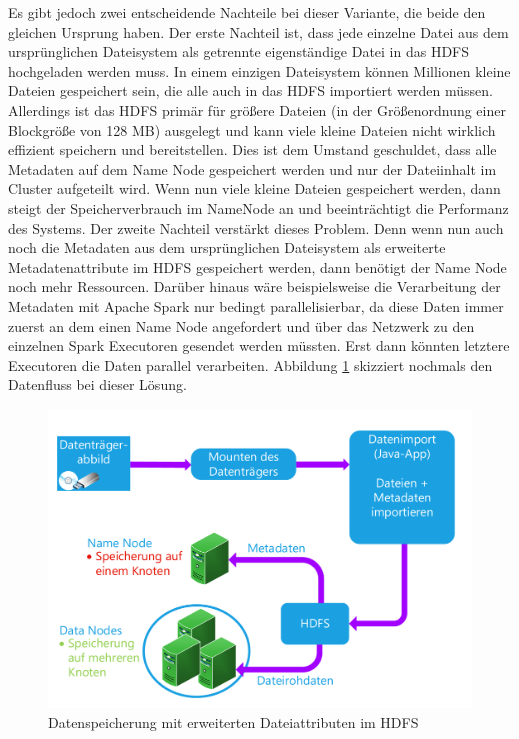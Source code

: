 \noindent
Es gibt jedoch zwei entscheidende Nachteile bei dieser Variante, die beide den gleichen Ursprung haben. 
Der erste Nachteil ist, dass jede einzelne Datei aus dem ursprünglichen Dateisystem als getrennte eigenständige Datei in das HDFS hochgeladen werden muss. In einem einzigen Dateisystem können Millionen kleine Dateien gespeichert sein, die alle auch in das HDFS importiert werden müssen. Allerdings ist das HDFS primär für größere Dateien (in der Größenordnung einer Blockgröße von 128 MB) ausgelegt und kann viele kleine Dateien nicht wirklich effizient speichern und bereitstellen. Dies ist dem Umstand geschuldet, dass alle Metadaten auf dem Name Node gespeichert werden und nur der Dateiinhalt im Cluster aufgeteilt wird.\cite[S. 16]{professional_hadoop} Wenn nun viele kleine Dateien gespeichert werden, dann steigt der Speicherverbrauch im NameNode an und beeinträchtigt die Performanz des Systems. Der zweite Nachteil verstärkt dieses Problem. Denn wenn nun auch noch die Metadaten aus dem ursprünglichen Dateisystem als erweiterte Metadatenattribute im HDFS gespeichert werden, dann benötigt der Name Node noch mehr Ressourcen. Darüber hinaus wäre beispielsweise die Verarbeitung der Metadaten mit Apache Spark nur bedingt parallelisierbar, da diese Daten immer zuerst an dem einen Name Node angefordert und über das Netzwerk zu den einzelnen Spark Executoren gesendet werden müssten. Erst dann könnten letztere Executoren die Daten parallel verarbeiten. Abbildung \ref{fig:storage_hdfs_extended_attributes} skizziert nochmals den Datenfluss bei dieser Lösung.\\

\begin{figure}[ht]
  \centering
  \includegraphics[width=\textwidth]{./resource/storage_hdfs_extended_attributes.pdf}
  \caption{Datenspeicherung mit erweiterten Dateiattributen im HDFS}
  \label{fig:storage_hdfs_extended_attributes}
\end{figure}

